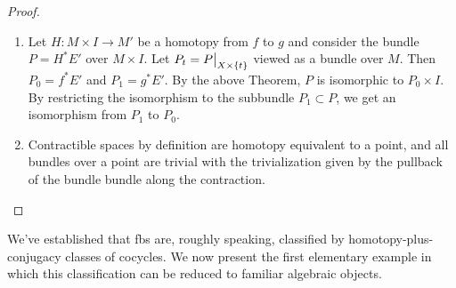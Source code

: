 \begin{proof}
\begin{enumerate}
    \item Let $H:M\times I\to M'$ be a homotopy from $f$ to $g$ and consider the bundle $P=H^\ast E'$ over $M\times I$. Let $P_t=\restr{P}{X\times\{t\}}$ viewed as a bundle over $M$. Then $P_0=f^\ast E'$ and $P_1=g^\ast E'$. By the above Theorem, $P$ is isomorphic to $P_0\times I$. By restricting the isomorphism to the subbundle $P_1\subset P$, we get an isomorphism from $P_1$ to $P_0$.
    \item Contractible spaces by definition are homotopy equivalent to a point, and all bundles over a point are trivial with the trivialization given by the pullback of the bundle bundle along the contraction.
\end{enumerate}
\end{proof}


We've established that \glspl{fb} are, roughly speaking, classified by homotopy-plus-conjugacy classes of cocycles. We now present the first elementary example in which this classification can be reduced to familiar algebraic objects.

